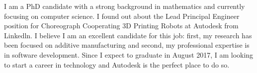 \documentclass[10pt,stdletter,dateno,sigleft,letterpaper]{newlfm} %
\begin{document}
\begin{newlfm}



I am a PhD candidate with a strong background in mathematics and currently focusing on computer science. I found out about the Lead Principal Engineer position for Choreograph Cooperating 3D Printing Robots at Autodesk from Linkedln. I believe I am an excellent candidate for this job: first, my research has been focused on additive manufacturing and second, my professional expertise is in software development. Since I expect to graduate in August 2017, I am looking to start a career in technology and Autodesk is the perfect place to do so.



\end{newlfm}
\end{document}
